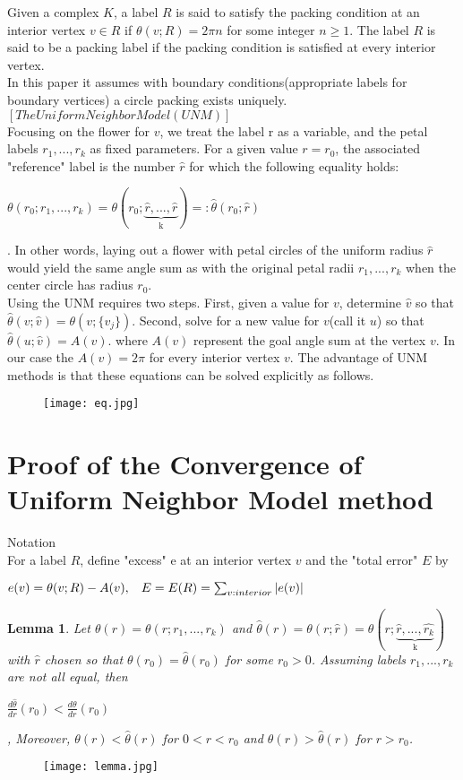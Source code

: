 \documentclass{SOP_KimMoran}
\newtheorem{lemma}{Lemma}
\begin{document}
\indent Given a complex $K$, a label $R$ is said to satisfy the packing condition at an interior vertex $v\in R$ if $\theta(v;R)=2\pi n$ for some integer $n\geq 1.$ The label $R$ is said to be a packing label if the packing condition is satisfied at every interior vertex. \\
\indent In this paper it assumes with boundary conditions(appropriate labels for boundary vertices) a circle packing exists uniquely.\bigskip \\
$[The Uniform Neighbor Model(UNM)]$\\
\indent Focusing on the flower for $v$, we treat the label r as a variable, and the petal labels $r_1,...,r_k$ as fixed parameters. For a given value $r=r_0$, the associated "reference" label is the number $\hat{r}$ for which the following equality holds:\\
\centerline{$ \theta(r_0;r_1,...,r_k)=\theta(r_0;\underbrace{\hat{r},...,\hat{r}}_\text{k} )=:\hat{\theta}(r_0;\hat{r})$}.
In other words, laying out a flower with petal circles of the uniform radius $\hat{r}$ would yield the same angle sum as with the original petal radii $r_1,...,r_k$ when the center circle has radius $r_0.$\\
Using the UNM requires two steps. First, given a value for $v$, determine $\hat{v}$ so that $\hat{\theta}(v;\hat{v})=\theta(v;\{v_j\})$. Second, solve for a new value for $v$(call it $u$) so that $\hat{\theta}(u;\hat{v})=A(v)$. where $A(v)$ represent the goal angle sum at the vertex $v$. In our case the $A(v)=2\pi$ for every interior vertex $v$. The advantage of UNM methods is that these equations can be solved explicitly as follows.\\
\begin{figure}[H]
  \texttt{[image: eq.jpg]}
\end{figure}


\section{Proof of the Convergence of Uniform Neighbor Model method}

\textbullet Notation\\
For a label $R$, define "excess" e at an interior vertex $v$ and the "total error" $E$ by \bigskip \\
\centerline{$e(v)=\theta(v;R)-A(v), \hspace{0.3cm}E=E(R)=\sum_{v:interior}|e(v)|$}

\begin{lemma}
Let $\theta(r)=\theta(r;r_1,...,r_k)$ and $\hat{\theta}(r)=\theta(r;\hat{r})=\theta(r;\underbrace{\hat{r},...,\hat{r_k}}_\text{k})$ with $\hat{r}$ chosen so that $\theta(r_0)=\hat{\theta}(r_0)$ for some $r_0>0$. Assuming labels $r_1,...,r_k$ are not all equal, then 
\centerline{$\frac{d\hat{\theta}}{dr}(r_0)<\frac{d\theta}{dr}(r_0)$},
Moreover, $\theta(r)<\hat{\theta}(r)$ for $0<r<r_0$ and $\theta(r)>\hat{\theta}(r)$ for $r>r_0$.
\end{lemma}
\begin{figure}[H]
  \texttt{[image: lemma.jpg]}
\end{figure}
\end{document}
